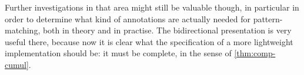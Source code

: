 Further investigations in that area might still be valuable though, in particular in order
to determine what kind of annotations are actually needed for pattern-matching, both
in theory and in practise. The bidirectional presentation is very useful there, because now
it is clear what the specification of a more lightweight implementation should be:
it must be complete, in the sense of \cref{thm:comp-cumul}.